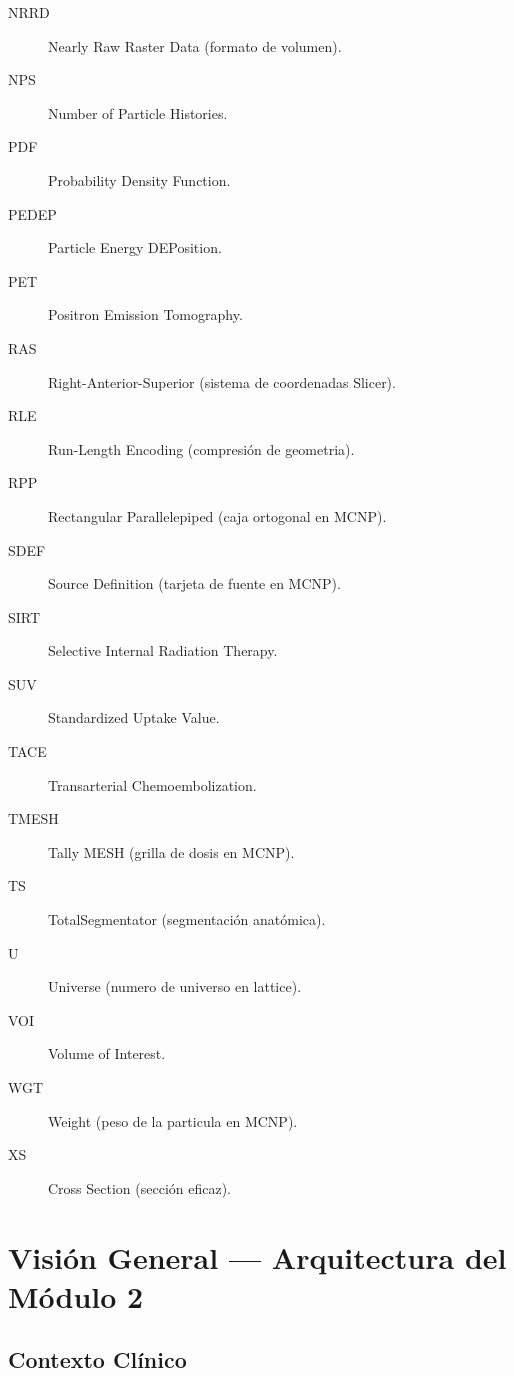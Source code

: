 \documentclass[12pt,a4paper]{article}
\begin{document}
\begin{description}
    \item[NRRD] Nearly Raw Raster Data (formato de volumen).
    \item[NPS] Number of Particle Histories.
    \item[PDF] Probability Density Function.
    \item[PEDEP] Particle Energy DEPosition.
    \item[PET] Positron Emission Tomography.
    \item[RAS] Right-Anterior-Superior (sistema de coordenadas Slicer).
    \item[RLE] Run-Length Encoding (compresión de geometria).
    \item[RPP] Rectangular Parallelepiped (caja ortogonal en MCNP).
    \item[SDEF] Source Definition (tarjeta de fuente en MCNP).
    \item[SIRT] Selective Internal Radiation Therapy.
    \item[SUV] Standardized Uptake Value.
    \item[TACE] Transarterial Chemoembolization.
    \item[TMESH] Tally MESH (grilla de dosis en MCNP).
    \item[TS] TotalSegmentator (segmentación anatómica).
    \item[U] Universe (numero de universo en lattice).
    \item[VOI] Volume of Interest.
    \item[WGT] Weight (peso de la particula en MCNP).
    \item[XS] Cross Section (sección eficaz).
\end{description}

\newpage

\tableofcontents
\newpage

\section{Visión General --- Arquitectura del Módulo 2}
\label{sec:vision}

\subsection{Contexto Clínico}
\end{document}
